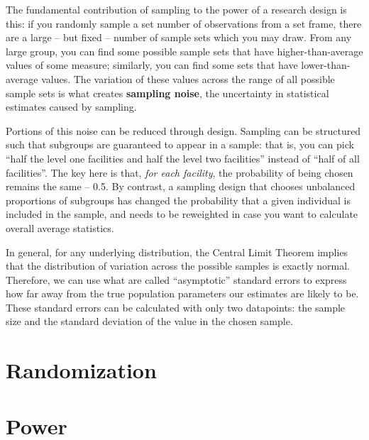 The fundamental contribution of sampling to the power of a research design is this:
if you randomly sample a set number of observations from a set frame,
there are a large -- but fixed -- number of sample sets which you may draw.
From any large group, you can find some possible sample sets
that have higher-than-average values of some measure;
similarly, you can find some sets that have lower-than-average values.
The variation of these values across the range of all possible sample sets is what creates
\textbf{sampling noise}, the uncertainty in statistical estimates caused by sampling.

Portions of this noise can be reduced through design.
Sampling can be structured such that subgroups are guaranteed to appear in a sample:
that is, you can pick ``half the level one facilities and half the level two facilities'' instead of
``half of all facilities''. The key here is that, \textit{for each facility},
the probability of being chosen remains the same -- 0.5.
By contrast, a sampling design that chooses unbalanced proportions of subgroups
has changed the probability that a given individual is included in the sample,
and needs to be reweighted in case you want to calculate overall average statistics.

In general, for any underlying distribution, the Central Limit Theorem implies that
the distribution of variation across the possible samples is exactly normal.
Therefore, we can use what are called ``asymptotic'' standard errors
to express how far away from the true population parameters our estimates are likely to be.
These standard errors can be calculated with only two datapoints:
the sample size and the standard deviation of the value in the chosen sample.



\section{Randomization}

\section{Power}

